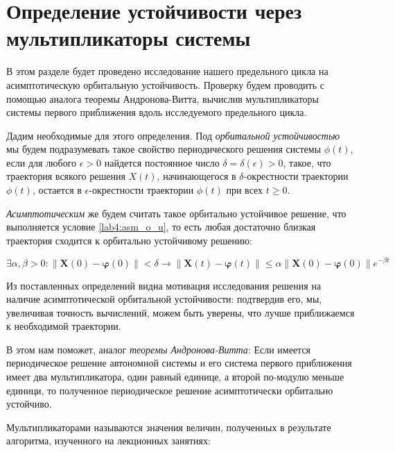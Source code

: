 \chapter{Определение устойчивости через мультипликаторы системы}\label{lab4}

В этом разделе будет проведено исследование нашего предельного цикла
на асимптотическую орбитальную устойчивость. Проверку будем проводить с помощью
аналога теоремы Андронова-Витта, вычислив мультипликаторы системы первого
приближения вдоль исследуемого предельного цикла.

Дадим необходимые для этого определения. Под \textit{орбитальной устойчивостью}
мы будем подразумевать такое свойство периодического решения системы $\phi(t)$,
если для любого $\epsilon > 0$ найдется постоянное число
$\delta=\delta(\epsilon) > 0$, такое, что траектория всякого решения $X(t)$,
начинающегося в $\delta$-окрестности траектории $\phi(t)$, остается в
$\epsilon$-окрестности траектории $\phi(t)$ при всех $t \geq 0$.

\textit{Асимптотическим} же будем считать такое орбитально устойчивое решение, что
выполняется условие \ref{lab4:asm_o_u}, то есть любая достаточно близкая
траектория сходится к орбитально устойчивому решению:

\begin{equation}\label{lab4:asm_o_u}
    \exists \alpha, \beta > 0:
    \left\| {\mathbf{X}\left( 0 \right) -
            \boldsymbol{\varphi} \left( 0 \right)}
    \right\| < \delta
    \rightarrow
    \left\| {\mathbf{X}\left( t \right) -
            \boldsymbol{\varphi} \left( t \right)}
    \right\| \le \alpha
    \left\| {\mathbf{X}\left( 0 \right) -
            \boldsymbol{\varphi} \left( 0 \right)}
    \right\|{e^{ - \beta t}}
\end{equation}

Из поставленных определений видна мотивация исследования решения на наличие
асимптотической орбитальной устойчивости: подтвердив его, мы, увеличивая
точность вычислений, можем быть уверены, что лучше приближаемся к необходимой
траектории.

В этом нам поможет, аналог \textit{теоремы Андронова-Витта}: Если имеется
периодическое решение автономной системы и его система первого приближения
имеет два мультипликатора, один равный единице, а второй по-модулю меньше
единици, то полученное периодическое решение асимптотически орбитально устойчиво.

\clearpage

Мультипликаторами называются значения величин, полученных в результате
алгоритма, изученного на лекционных занятиях:

